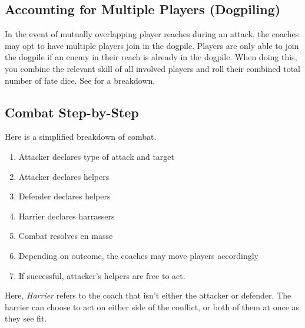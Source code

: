 \subsection{Accounting for Multiple Players (Dogpiling)}\label{dogpiling}
In the event of mutually overlapping player reaches during an attack, the coaches may opt to have multiple players join in the dogpile.
Players are only able to join the dogpile if an enemy in their reach is already in the dogpile.
When doing this, you combine the relevant skill of all involved players and roll their combined total number of fate dice. 
See  for a breakdown.

\subsection{Combat Step-by-Step}\label{combat-step-by-step}
Here is a simplified breakdown of combat.
\begin{enumerate}
    \item Attacker declares type of attack and target
    \item Attacker declares helpers
    \item Defender declares helpers
    \item Harrier declares harrassers
    \item Combat resolves en masse
    \item Depending on outcome, the coaches may move players accordingly
    \item If successful, attacker's helpers are free to act.
\end{enumerate}

\begin{note}
Here, \textit{Harrier} refers to the coach that isn't either the attacker or defender. 
The harrier can choose to act on either side of the conflict, or both of them at once as they see fit.
\end{note}

